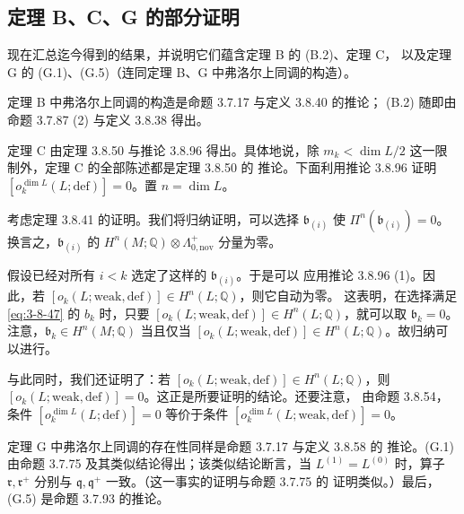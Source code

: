 
\subsection{定理 B、C、G 的部分证明}
\label{subsec:3-8-10}

现在汇总迄今得到的结果，并说明它们蕴含定理 B 的 (B.2)、定理 C，
以及定理 G 的 (G.1)、(G.5)（连同定理 B、G 中弗洛尔上同调的构造）。

定理 B 中弗洛尔上同调的构造是命题 3.7.17 与定义 3.8.40 的推论；
(B.2) 随即由命题 3.7.87 (2) 与定义 3.8.38 得出。

定理 C 由定理 3.8.50 与推论 3.8.96 得出。具体地说，除
$m_k<\dim L/2$ 这一限制外，定理 C 的全部陈述都是定理 3.8.50 的
推论。下面利用推论 3.8.96 证明
$[o_k^{\dim L}(L;\mathrm{def})]=0$。置 $n=\dim L$。

考虑定理 3.8.41 的证明。我们将归纳证明，可以选择
$\mathfrak b_{(i)}$ 使
$\Pi^n(\mathfrak b_{(i)})=0$。换言之，$\mathfrak b_{(i)}$ 的
$H^n(M;\mathbb Q)\otimes\Lambda^+_{0,\mathrm{nov}}$ 分量为零。

假设已经对所有 $i<k$ 选定了这样的 $\mathfrak b_{(i)}$。于是可以
应用推论 3.8.96 (1)。因此，若
$[o_k(L;\mathrm{weak,def})]\in H^n(L;\mathbb Q)$，则它自动为零。
这表明，在选择满足 \eqref{eq:3-8-47} 的 $b_k$ 时，只要
$[o_k(L;\mathrm{weak,def})]\in H^n(L;\mathbb Q)$，就可以取
$\mathfrak b_k=0$。注意，$\mathfrak b_k\in H^n(M;\mathbb Q)$ 当且仅当
$[o_k(L;\mathrm{weak,def})]\in H^n(L;\mathbb Q)$。故归纳可以进行。

与此同时，我们还证明了：若
$[o_k(L;\mathrm{weak,def})]\in H^n(L;\mathbb Q)$，则
$[o_k(L;\mathrm{weak,def})]=0$。这正是所要证明的结论。还要注意，
由命题 3.8.54，条件
$[o_k^{\dim L}(L;\mathrm{def})]=0$ 等价于条件
$[o_k^{\dim L}(L;\mathrm{weak,def})]=0$。

定理 G 中弗洛尔上同调的存在性同样是命题 3.7.17 与定义 3.8.58 的
推论。(G.1) 由命题 3.7.75 及其类似结论得出；该类似结论断言，当
$L^{(1)}=L^{(0)}$ 时，算子 $\mathfrak r,\mathfrak r^+$ 分别与
$\mathfrak q,\mathfrak q^+$ 一致。（这一事实的证明与命题 3.7.75 的
证明类似。）最后，(G.5) 是命题 3.7.93 的推论。
